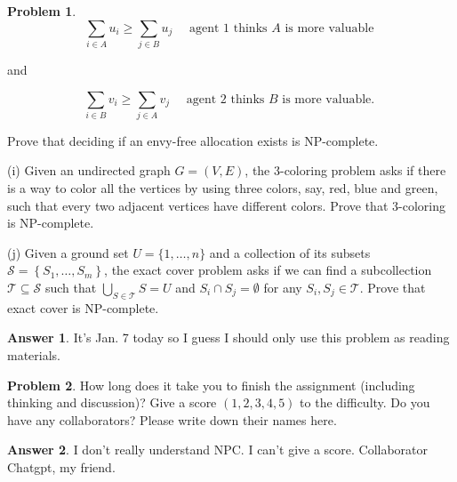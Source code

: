\documentclass{article}
\theoremstyle{definition}
\newtheorem{prob}{Problem}
\newtheorem{ans}{Answer}
\begin{document}
\begin{prob}
		$$
		\sum_{i \in A} u_{i} \geq \sum_{j \in B} u_{j} \quad \text { agent } 1 \text { thinks } A \text { is more valuable }
		$$
		
		and
		
		$$
		\sum_{i \in B} v_{i} \geq \sum_{j \in A} v_{j} \quad \text { agent } 2 \text { thinks } B \text { is more valuable. }
		$$
		
		Prove that deciding if an envy-free allocation exists is NP-complete.
		
		(i) Given an undirected graph $G=(V, E)$, the 3-coloring problem asks if there is a way to color all the vertices by using three colors, say, red, blue and green, such that every two adjacent vertices have different colors. Prove that 3-coloring is NP-complete.
		
		(j) Given a ground set $U=\{1, \ldots, n\}$ and a collection of its subsets $\mathcal{S}=\left\{S_{1}, \ldots, S_{m}\right\}$, the exact cover problem asks if we can find a subcollection $\mathcal{T} \subseteq \mathcal{S}$ such that $\bigcup_{S \in \mathcal{T}} S=U$ and $S_{i} \cap S_{j}=\emptyset$ for any $S_{i}, S_{j} \in \mathcal{T}$. Prove that exact cover is NP-complete.
	\end{prob}

	\begin{ans}
		It's Jan. 7 today so I guess I should only use this problem as reading materials.		
	\end{ans}

	\begin{prob}
		How long does it take you to finish the assignment (including thinking and discussion)? Give a score $(1,2,3,4,5)$ to the difficulty. Do you have any collaborators? Please write down their names here.
	\end{prob}

	\begin{ans}
		I don't really understand NPC. I can't give a score. Collaborator Chatgpt, my friend. 
	\end{ans}
\end{document}
